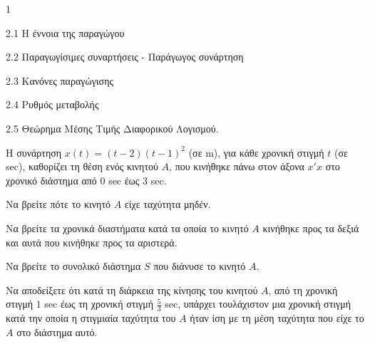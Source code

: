 \begin{ylh}{1}
    \item 2.1 Η έννοια της παραγώγου
    \item 2.2 Παραγωγίσιμες συναρτήσεις - Παράγωγος συνάρτηση
    \item 2.3 Κανόνες παραγώγισης
    \item 2.4 Ρυθμός μεταβολής
    \item 2.5 Θεώρημα Μέσης Τιμής Διαφορικού Λογισμού.
\end{ylh}
Η συνάρτηση $x(t)=(t-2)(t-1)^2$ (σε m), για κάθε χρονική στιγμή $t$ (σε sec), καθορίζει τη θέση ενός κινητού $A$, που κινήθηκε πάνω στον άξονα $x'x$ στο χρονικό διάστημα από $0$ sec έως $3$ sec.
\begin{alist}
\item
    \begin{rlist}
    \item Να βρείτε πότε το κινητό $A$ είχε ταχύτητα μηδέν. 
    \item Να βρείτε τα χρονικά διαστήματα κατά τα οποία το κινητό $A$ κινήθηκε προς τα δεξιά και αυτά που κινήθηκε προς τα αριστερά. 
    \end{rlist}
\item Να βρείτε το συνολικό διάστημα $S$ που διάνυσε το κινητό $A$. 
\item Να αποδείξετε ότι κατά τη διάρκεια της κίνησης του κινητού $A$, από τη χρονική στιγμή $1$ sec έως τη χρονική στιγμή $\frac{5}{3}$ sec, υπάρχει τουλάχιστον μια χρονική στιγμή κατά την οποία η στιγμιαία ταχύτητα του $A$ ήταν ίση με τη μέση ταχύτητα που είχε το $A$ στο διάστημα αυτό. 
\end{alist}
